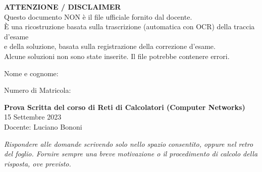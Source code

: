 \documentclass[12pt,a4paper]{article}
\newcommand{\blankline}[1][1cm]{\underline{\hspace{#1}}}
\begin{document}
\begin{center}
    \Large\textbf{ATTENZIONE / DISCLAIMER} \\[0.5em]
    \normalsize Questo documento NON è il file ufficiale fornito dal docente. \\
    È una ricostruzione basata sulla trascrizione (automatica con OCR) della traccia d'esame \\
    e della soluzione, basata sulla registrazione della correzione d'esame. \\
    Alcune soluzioni non sono state inserite. Il file potrebbe contenere errori.
\end{center}

\vspace{1cm}

\noindent Nome e cognome: \blankline[6cm]

\noindent Numero di Matricola: \blankline[6cm]

\begin{center}
    \Large\textbf{Prova Scritta del corso di Reti di Calcolatori (Computer Networks)} \\[0.5em]
    \normalsize 15 Settembre 2023 \\[0.5em]
    Docente: Luciano Bononi
\end{center}

\vspace{0.5cm}
\noindent\textit{Rispondere alle domande scrivendo solo nello spazio consentito, oppure nel retro del foglio. Fornire sempre una breve motivazione o il procedimento di calcolo della risposta, ove previsto.}
\vspace{0.5cm}
\end{document}
